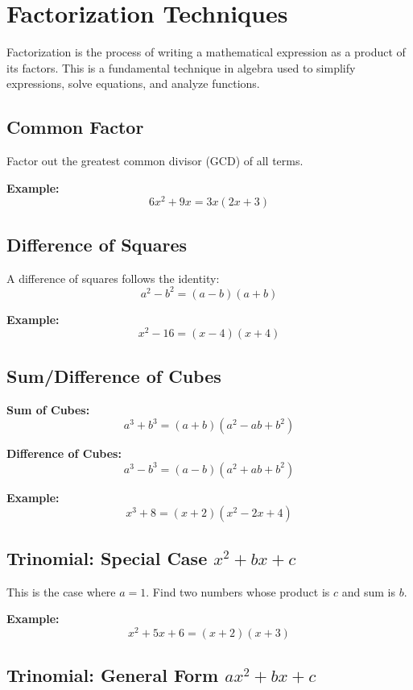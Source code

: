 \section{Factorization Techniques}

Factorization is the process of writing a mathematical expression as a product of its factors. This is a fundamental technique in algebra used to simplify expressions, solve equations, and analyze functions.

\subsection{Common Factor}

Factor out the greatest common divisor (GCD) of all terms.

\textbf{Example:}
\[
6x^2 + 9x = 3x(2x + 3)
\]

\subsection{Difference of Squares}

A difference of squares follows the identity:
\[
a^2 - b^2 = (a - b)(a + b)
\]

\textbf{Example:}
\[
x^2 - 16 = (x - 4)(x + 4)
\]

\subsection{Sum/Difference of Cubes}

\textbf{Sum of Cubes:}
\[
a^3 + b^3 = (a + b)(a^2 - ab + b^2)
\]

\textbf{Difference of Cubes:}
\[
a^3 - b^3 = (a - b)(a^2 + ab + b^2)
\]

\textbf{Example:}
\[
x^3 + 8 = (x + 2)(x^2 - 2x + 4)
\]


\subsection{Trinomial: Special Case \texorpdfstring{\(x^2 + bx + c\)}{x² + bx + c}}

This is the case where \(a = 1\). Find two numbers whose product is \(c\) and sum is \(b\).

\textbf{Example:}
\[
x^2 + 5x + 6 = (x + 2)(x + 3)
\]


\subsection{Trinomial: General Form \texorpdfstring{\(ax^2 + bx + c\)}{ax² + bx + c}}

